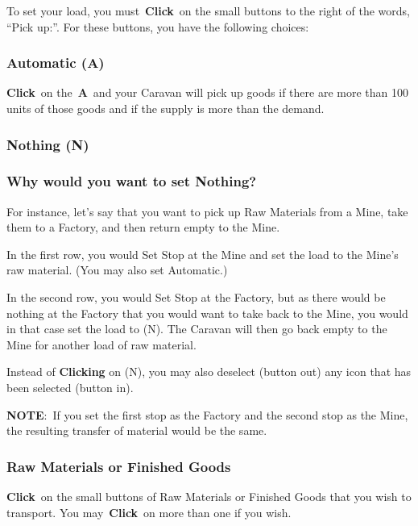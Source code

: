 To set your load, you must \textbf{Click} on the small buttons to the right of the words, “Pick up:”. For these buttons, you have the following choices:

\subsubsection{Automatic (A)}

\textbf{Click} on the \textbf{A} and your Caravan will pick up goods if there are more than 100 units of those goods and if the supply is more than the demand.

\subsubsection{Nothing (N)}

\subsubsection{Why would you want to set Nothing?}

For instance, let’s say that you want to pick up Raw Materials from a Mine, take them to a Factory, and then return empty to the Mine.

\begin{adjustwidth}{1cm}{}
In the first row, you would Set Stop at the Mine and set the load to the Mine’s raw material. (You may also set Automatic.)

In the second row, you would Set Stop at the Factory, but as there would be nothing at the Factory that you would want to take back to the Mine, you would in that case set the load to (N). The Caravan will then go back empty to the Mine for another load of raw material.

Instead of \textbf{Clicking} on (N), you may also deselect (button out) any icon that has been selected (button in).
\end{adjustwidth}

\textbf{NOTE}: If you set the first stop as the Factory and the second stop as the Mine, the resulting transfer of material would be the same.

\subsubsection{Raw Materials or Finished Goods}

\textbf{Click} on the small buttons of Raw Materials or Finished Goods that you wish to transport. You may \textbf{Click} on more than one if you wish.

